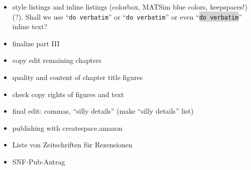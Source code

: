 \begin{itemize}
\item style listings and inline listings (colorbox, MATSim blue colors, keepspaces!) (?). Shall we use ``\verb|do verbatim|'' or ``\lstinline|do verbatim|'' or even ``\colorbox{lightgray}{\lstinline|do verbatim|}'' inline text?

\item finalize part III

\item copy edit remaining chapters

\item quality and content of chapter title figures

\item check copy rights of figures and text

\item final edit: commas, ``silly details'' (make ``silly details'' list)

\item publishing with createspace.amazon

\item Liste von Zeitschriften für Rezensionen

\item SNF-Pub-Antrag








\end{itemize}



